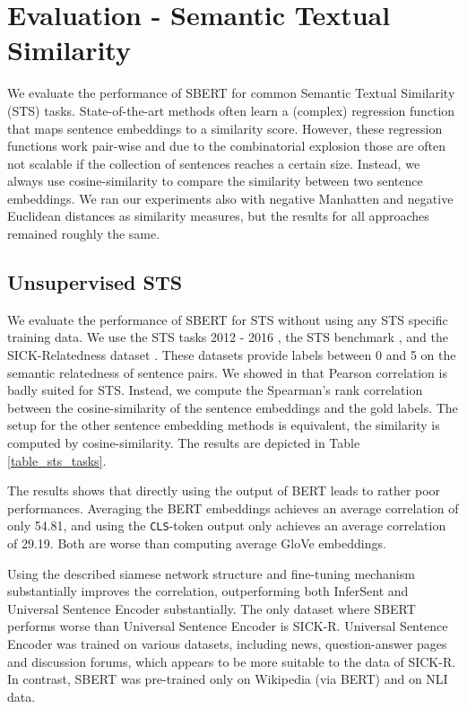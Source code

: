 \documentclass[11pt,a4paper]{article}
\begin{document}
\section{Evaluation - Semantic Textual Similarity} \label{sec_eval_sts}


We evaluate the performance of SBERT for common Semantic Textual Similarity (STS) tasks. State-of-the-art methods often learn a (complex) regression function that maps sentence embeddings to a similarity score. However, these regression functions work pair-wise and due to the combinatorial explosion those are often not scalable if the collection of sentences reaches a certain size. Instead, we always use cosine-similarity to compare the similarity between two sentence embeddings. We ran our experiments also with negative Manhatten and negative Euclidean distances as similarity measures, but the results for all approaches remained roughly the same.

\subsection{Unsupervised STS}
We evaluate the performance of SBERT for STS without using any STS specific training data. We use the STS tasks 2012 - 2016 \cite{sts2012, sts2013, sts2014, sts2015, sts2016}, the STS benchmark \cite{sts2017}, and the SICK-Relatedness dataset \cite{sick}. These datasets provide labels between 0 and 5 on the semantic relatedness of sentence pairs. We showed in \cite{Reimers2016_STS} that Pearson correlation is badly suited for STS. Instead, we compute the Spearman's rank correlation between the cosine-similarity of the sentence embeddings and the gold labels. The setup for the other sentence embedding methods is equivalent, the similarity is computed by cosine-similarity. The results are depicted in Table \ref{table_sts_tasks}. 

The results shows that directly using the output of BERT leads to rather poor performances. Averaging the BERT embeddings achieves an average correlation of only 54.81, and using the \texttt{CLS}-token output only achieves an average correlation of 29.19. Both are worse than computing average GloVe embeddings. 

Using the described siamese network structure and fine-tuning mechanism substantially improves the correlation, outperforming both InferSent and Universal Sentence Encoder substantially. The only dataset where SBERT performs worse than Universal Sentence Encoder is SICK-R. Universal Sentence Encoder was trained on various datasets, including news, question-answer pages and discussion forums, which appears to be more suitable to the data of SICK-R. In contrast, SBERT was pre-trained only on Wikipedia (via BERT) and on NLI data.
\end{document}
